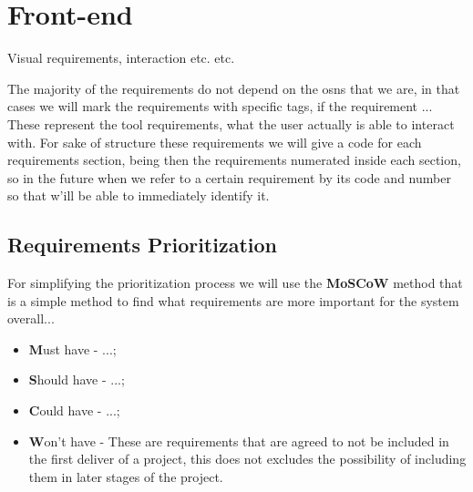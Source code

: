 
\section{Front-end}

Visual requirements, interaction etc. etc.

The majority of the requirements do not depend on the \glspl{osn} that we are, in that cases we will mark the requirements with specific tags, if the requirement
...\\

\indent These represent the tool requirements, what the user actually is able to interact with. For sake of structure these requirements we will give a code for each
requirements section, being then the requirements numerated inside each section, so in the future when we refer to a certain requirement by its code and number so that w'ill be able to immediately identify it.\\

\subsection{Requirements Prioritization}
For simplifying the prioritization process we will use the \textbf{MoSCoW} method that is a simple method to find what requirements are more important for the system overall...

\begin{itemize}
    \item \textbf{M}ust have - ...;
    \item \textbf{S}hould have - ...;
    \item \textbf{C}ould have - ...;
    \item \textbf{W}on't have - These are requirements that are agreed to not be included in the first deliver of a project, this does not excludes the possibility of including them in later stages of the project.
\end{itemize}

